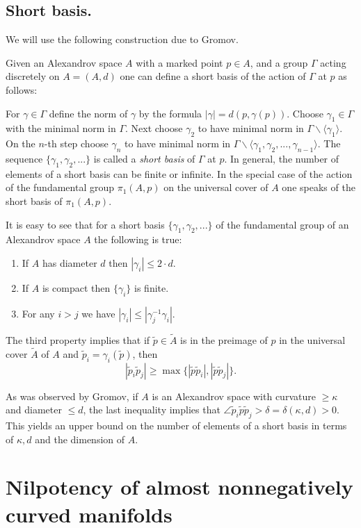 \documentclass{amsart}
\begin{document}
\subsection{Short basis.}\label{short-basis} We will use the following construction due to Gromov.

Given an Alexandrov space $A$ with a marked point $p\in A$,  and  a group $\Gamma$ acting discretely on $A=(A,d)$ one can define a short basis of the action of $\Gamma$ at $p$ as follows:

For $\gamma\in \Gamma$ define the norm of $\gamma$ by the formula
$|\gamma|= d(p,\gamma(p))$.
Choose $\gamma_1\in \Gamma$
with  the minimal norm in $\Gamma$.
Next choose $\gamma_2$ to have
minimal norm in $\Gamma\backslash \langle\gamma_1\rangle$.
On the $n$-th step choose
$\gamma_n$ to have minimal norm in
$\Gamma\backslash \langle\gamma_1,\gamma_2,...,\gamma_{n-1}\rangle$.
The sequence $\{\gamma_1,\gamma_2,...\}$
is called a \emph{short basis} of $\Gamma$ at $p$.
In general, the number of elements of a short basis can be finite or infinite.
In the special case of the action of the fundamental group $\pi_1(A,p)$  on the universal cover of $A$
 one speaks of the short basis of  $\pi_1(A,p)$.

It is easy to see that for a short basis
$\{\gamma_1,\gamma_2,...\}$ of the fundamental group of an Alexandrov space $A$
the following is true:
\begin{enumerate}
\item If $A$ has diameter $d$ then $|\gamma_i|\le 2\cdot d$.
\item If $A$ is compact then $\{\gamma_i\}$ is finite.
\item For any $i>j$ we have $|\gamma_i|\le |\gamma_j^{-1}\gamma_i|$.
\end{enumerate}
The third property implies that if
$\tilde p \in \tilde A$
is in the preimage of $p$ in the universal cover $\tilde A$ of $A$
and $\tilde p_i=\gamma_i(\tilde p)$, then
$$|\tilde p_i\tilde p_j|\ge
\max\{|\tilde p\tilde p_i|,|\tilde p\tilde p_j|\}.$$

As was observed by Gromov, if $A$ is an Alexandrov space with curvature $\ge \kappa$ and diameter $\le d$, the last inequality implies that $\angle \tilde p_i \tilde p \tilde p_j>\delta=\delta(\kappa,d)>0$.
This yields an upper bound on the number of elements
of a short basis in terms of $\kappa,d$ and the dimension of $A$.


\section{Nilpotency of almost nonnegatively curved manifolds}\label{sec:nilp}
\end{document}
